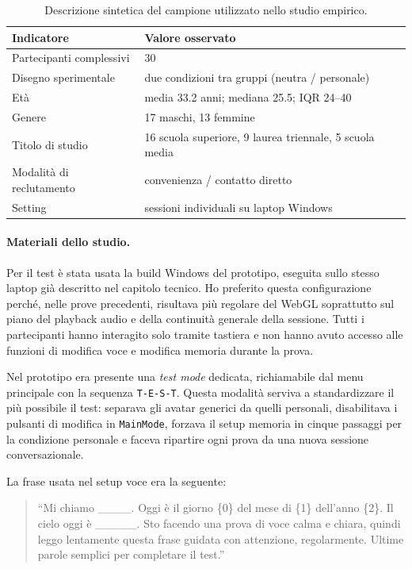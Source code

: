 \begin{table}[H]
\centering
\small
\begin{tabularx}{\textwidth}{lX}
\hline
\textbf{Indicatore} & \textbf{Valore osservato} \\
\hline
Partecipanti complessivi & 30 \\
Disegno sperimentale & due condizioni tra gruppi (neutra / personale) \\
Età & media 33.2 anni; mediana 25.5; IQR 24--40 \\
Genere & 17 maschi, 13 femmine \\
Titolo di studio & 16 scuola superiore, 9 laurea triennale, 5 scuola media \\
Modalità di reclutamento & convenienza / contatto diretto \\
Setting & sessioni individuali su laptop Windows \\
\hline
\end{tabularx}
\caption{Descrizione sintetica del campione utilizzato nello studio empirico.}
\label{tab:empirical-sample}
\end{table}

\paragraph{Materiali dello studio.}
\label{subsec:empirical-materials}

Per il test è stata usata la build Windows del prototipo, eseguita sullo stesso laptop già descritto nel capitolo tecnico. Ho preferito questa configurazione perché, nelle prove precedenti, risultava più regolare del WebGL soprattutto sul piano del playback audio e della continuità generale della sessione. Tutti i partecipanti hanno interagito solo tramite tastiera e non hanno avuto accesso alle funzioni di modifica voce e modifica memoria durante la prova.

Nel prototipo era presente una \textit{test mode} dedicata, richiamabile dal menu principale con la sequenza \texttt{T-E-S-T}. Questa modalità serviva a standardizzare il più possibile il test: separava gli avatar generici da quelli personali, disabilitava i pulsanti di modifica in \texttt{MainMode}, forzava il setup memoria in cinque passaggi per la condizione personale e faceva ripartire ogni prova da una nuova sessione conversazionale.

La frase usata nel setup voce era la seguente:

\begin{quote}
``Mi chiamo \_\_\_\_. Oggi è il giorno \{0\} del mese di \{1\} dell'anno \{2\}. Il cielo oggi è \_\_\_\_\_. Sto facendo una prova di voce calma e chiara, quindi leggo lentamente questa frase guidata con attenzione, regolarmente. Ultime parole semplici per completare il test.''
\end{quote}

